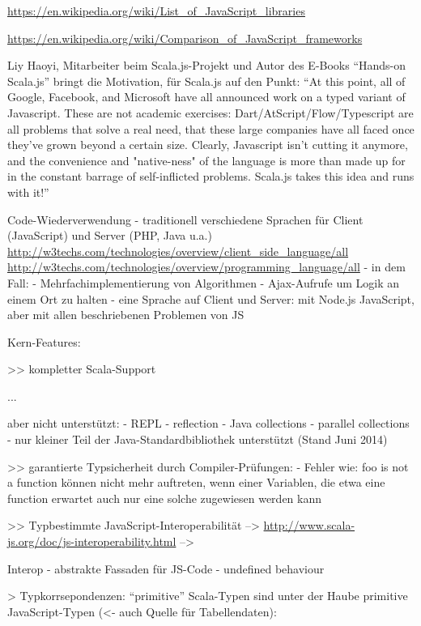 \documentclass[a4paper, 12pt, listof=totoc, bibliography=totoc]{scrreprt}
\begin{document}
\url{https://en.wikipedia.org/wiki/List_of_JavaScript_libraries}

\url{https://en.wikipedia.org/wiki/Comparison_of_JavaScript_frameworks}


Liy Haoyi, Mitarbeiter beim Scala.js-Projekt und Autor des E-Books "`Hands-on Scala.js"' bringt die Motivation, für Scala.js auf den Punkt: "`At this point, all of Google, Facebook, and Microsoft have all announced work on a typed variant of Javascript. These are not academic exercises: Dart/AtScript/Flow/Typescript are all problems that solve a real need, that these large companies have all faced once they've grown beyond a certain size. Clearly, Javascript isn't cutting it anymore, and the convenience and "native-ness" of the language is more than made up for in the constant barrage of self-inflicted problems. Scala.js takes this idea and runs with it!"'\cite{haoyi.HOS}


Code-Wiederverwendung
- traditionell verschiedene Sprachen für Client (JavaScript) und Server (PHP, Java u.a.)
	\url{http://w3techs.com/technologies/overview/client_side_language/all}
	\url{http://w3techs.com/technologies/overview/programming_language/all}
	- in dem Fall:
		- Mehrfachimplementierung von Algorithmen
		- Ajax-Aufrufe um Logik an einem Ort zu halten
- eine Sprache auf Client und Server: mit Node.js JavaScript, aber mit allen beschriebenen Problemen von JS






Kern-Features:

>> kompletter Scala-Support

...

aber nicht unterstützt:
- REPL
- reflection
- Java collections
- parallel collections
\cite{doeraene2013.CSJ}
- nur kleiner Teil der Java-Standardbibliothek unterstützt (Stand Juni 2014)\cite{doeraene2014.WHB}


>> garantierte Typsicherheit durch Compiler-Prüfungen:
- Fehler wie: foo is not a function können nicht mehr auftreten, wenn einer Variablen, die etwa eine function erwartet auch nur eine solche zugewiesen werden kann


>> Typbestimmte JavaScript-Interoperabilität
-->  \url{http://www.scala-js.org/doc/js-interoperability.html}
-->  \cite{doeraene2013.TDI}

Interop
- abstrakte Fassaden für JS-Code
- undefined behaviour


> Typkorrsepondenzen: "`primitive"' Scala-Typen sind unter der Haube primitive JavaScript-Typen\cite{doeraene2014.WHB} (<- auch Quelle für Tabellendaten):
\end{document}
